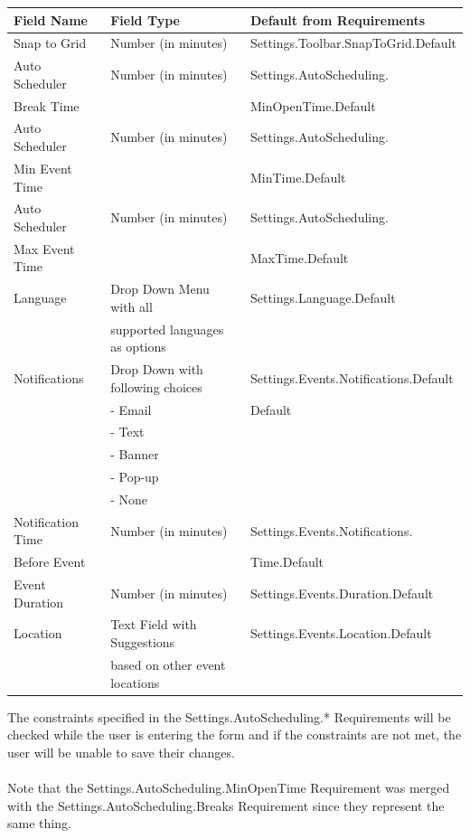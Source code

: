 \documentclass{scrreprt}
\begin{document}
\begin{center}
\begin{longtable}{ | p{3cm} | p{6cm} | p{6cm} | }
\hline
\textbf{Field Name} & \textbf{Field Type} & \textbf{Default from Requirements} \\
\hline
Snap to Grid & Number (in minutes) & Settings.Toolbar.SnapToGrid.Default \\
\hline
Auto Scheduler & Number (in minutes) & Settings.AutoScheduling. \\
Break Time & & MinOpenTime.Default\\
\hline
Auto Scheduler & Number (in minutes) & Settings.AutoScheduling. \\
Min Event Time & & MinTime.Default\\
\hline
Auto Scheduler & Number (in minutes) & Settings.AutoScheduling. \\
Max Event Time & & MaxTime.Default\\
\hline
Language & Drop Down Menu with all & Settings.Language.Default \\
& supported languages as options & \\
\hline
Notifications & Drop Down with following choices & Settings.Events.Notifications.Default \\
& - Email & Default\\
& - Text & \\
& - Banner & \\
& - Pop-up & \\
& - None & \\
\hline
Notification Time & Number (in minutes) & Settings.Events.Notifications. \\
Before Event & & Time.Default \\
\hline
Event Duration & Number (in minutes) & Settings.Events.Duration.Default \\
\hline
Location & Text Field with Suggestions & Settings.Events.Location.Default \\
& based on other event locations & \\
\hline
\end{longtable}
\end{center}
The constraints specified in the Settings.AutoScheduling.* Requirements will be checked while the user is entering the form and if the constraints are not met, the user will be unable to save their changes.
\\\\
Note that the Settings.AutoScheduling.MinOpenTime Requirement was merged with the Settings.AutoScheduling.Breaks Requirement since they represent the same thing.
\end{document}
